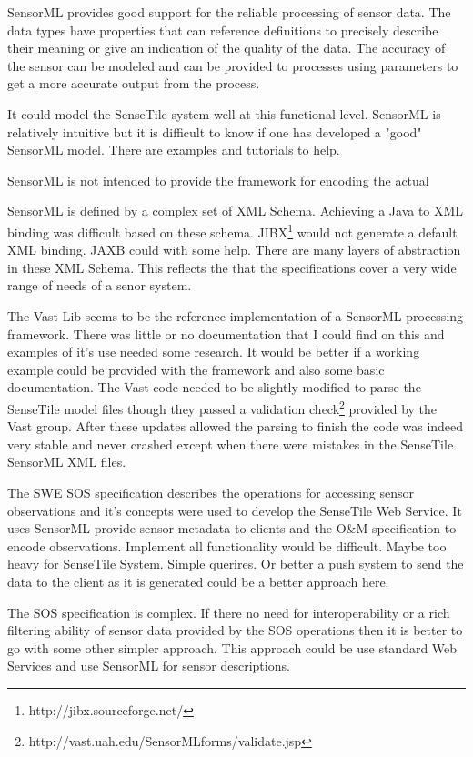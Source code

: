 \documentclass[]{final_report}
\begin{document}
SensorML provides good support for the reliable processing of sensor data. The data types have properties that can reference definitions to precisely describe their meaning or give an indication of the quality of the data.  The accuracy of the sensor can be modeled and can be provided to processes using parameters to get a more accurate output from the process.

It could model the SenseTile system well at this functional level. 
SensorML is relatively intuitive but it is difficult to know if one has developed a "good" SensorML model. There are examples and tutorials to help. 

SensorML is not intended to provide the framework for encoding the actual

SensorML is defined by a complex set of XML Schema. Achieving a Java to XML binding was difficult based on these schema. JIBX\footnote{http://jibx.sourceforge.net/} would not generate a default XML binding. JAXB could with some help. There are many layers of abstraction in these XML Schema. This reflects the that the specifications cover a very wide range of needs of a senor system. 

The Vast Lib seems to be the reference implementation of a SensorML processing framework. There was little or no documentation that I could find on this and examples of it's use needed some research. It would be better if a working example could be provided with the framework and also some basic documentation. The Vast code needed to be slightly modified to parse the SenseTile model files though they passed a validation check\footnote{http://vast.uah.edu/SensorMLforms/validate.jsp} provided by the Vast group. After these updates allowed the parsing to finish the code was indeed very stable and never crashed except when there were mistakes in the SenseTile SensorML XML files.

The SWE SOS specification describes the operations for accessing sensor observations and it's concepts were used to develop the SenseTile Web Service. It uses SensorML provide sensor metadata to clients and the O\&M specification to encode observations.
Implement all functionality would be difficult. Maybe too heavy for SenseTile System. Simple querires. Or better a push system to send the data to the client as it is generated could be a better approach here.

The SOS specification is complex. If there no need for interoperability or a rich filtering ability of sensor data provided by the SOS operations then it is better to go with some other simpler approach.  This approach could be use standard Web Services and use SensorML for sensor descriptions.
\end{document}
